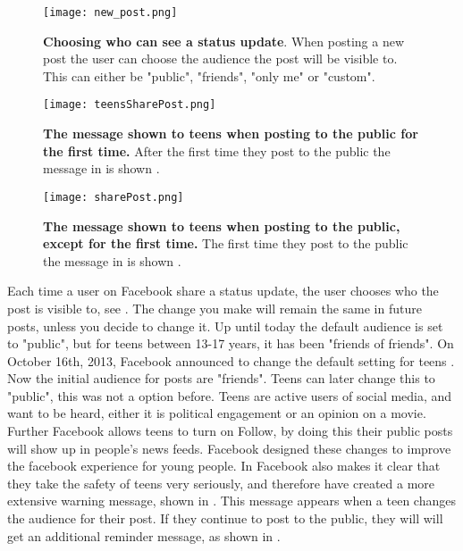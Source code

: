 \begin{figure}[h!]
\centering
\texttt{[image: new\_post.png]}
\caption[Choosing who can see a status update.]{\textbf{Choosing who can see a status update}. When posting a new post the user can choose the audience the post will be visible to. This can either be "public", "friends", "only me" or "custom".} 
\label{fig:newPost}
\end{figure}

\begin{figure}[h!]
\centering
\texttt{[image: teensSharePost.png]}
\caption[The message shown to teens when posting to the public for the first time]{\textbf{The message shown to teens when posting to the public for the first time.} After the first time they post to the public the message in  is shown \cite{defaultTeens}.} 
\label{fig:teensSharePost}
\end{figure}

\begin{figure}[h!]
\centering
\texttt{[image: sharePost.png]}
\caption [The message shown to teens when posting to the public, except for the first time]{\textbf{The message shown to teens when posting to the public, except for the first time.} The first time they post to the public the message in  is shown \cite{defaultTeens}.} 
\label{fig:sharePost}
\end{figure}

Each time a user on Facebook share a status update, the user chooses who the post is visible to, see . The change you make will remain the same in future posts, unless you decide to change it. Up until today the default audience is set to "public", but for teens between 13-17 years, it has been "friends of friends". On October 16th, 2013, Facebook announced to change the default setting for teens \cite{defaultTeens}. Now the initial audience for posts are "friends". Teens can later change this to "public", this was not a option before. Teens are active users of social media, and want to be heard, either it is political engagement or an opinion on a movie. Further Facebook allows teens to turn on Follow, by doing this their public posts will show up in people's news feeds. Facebook designed these changes to improve the facebook experience for young people. In \cite{defaultTeens} Facebook also makes it clear that they take the safety of teens very seriously, and therefore have created a more extensive warning message, shown in  . This message appears when a teen changes the audience for their post. If they continue to post to the public, they will will get an additional reminder message, as shown in  .

